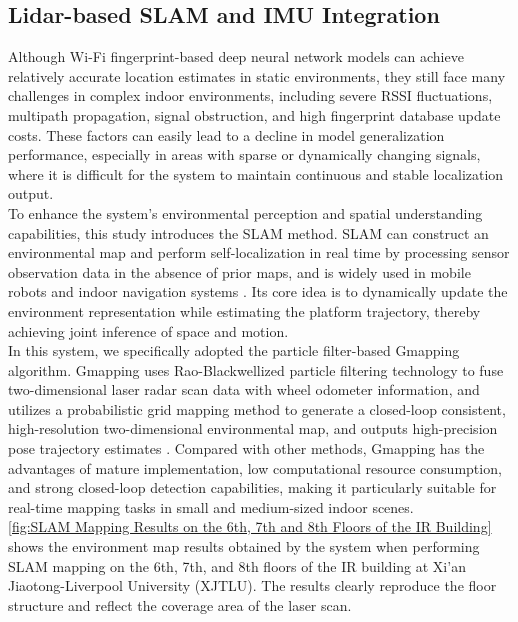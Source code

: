 \documentclass[12pt,a4paper]{article}
\numberwithin{equation}{section}
\begin{document}
\subsection{Lidar-based SLAM and IMU Integration}
Although Wi-Fi fingerprint-based deep neural network models can achieve relatively accurate location estimates in static environments, they still face many challenges in complex indoor environments, including severe RSSI fluctuations, multipath propagation, signal obstruction, and high fingerprint database update costs. These factors can easily lead to a decline in model generalization performance, especially in areas with sparse or dynamically changing signals, where it is difficult for the system to maintain continuous and stable localization output.\\
To enhance the system's environmental perception and spatial understanding capabilities, this study introduces the SLAM method. SLAM can construct an environmental map and perform self-localization in real time by processing sensor observation data in the absence of prior maps, and is widely used in mobile robots and indoor navigation systems \cite{durrant2006slam}. Its core idea is to dynamically update the environment representation while estimating the platform trajectory, thereby achieving joint inference of space and motion.\\
In this system, we specifically adopted the particle filter-based Gmapping algorithm. Gmapping uses Rao-Blackwellized particle filtering technology to fuse two-dimensional laser radar scan data with wheel odometer information, and utilizes a probabilistic grid mapping method to generate a closed-loop consistent, high-resolution two-dimensional environmental map, and outputs high-precision pose trajectory estimates \cite{grisetti2007improved}. Compared with other methods, Gmapping has the advantages of mature implementation, low computational resource consumption, and strong closed-loop detection capabilities, making it particularly suitable for real-time mapping tasks in small and medium-sized indoor scenes.\\
\autoref{fig:SLAM Mapping Results on the 6th, 7th and 8th Floors of the IR Building} shows the environment map results obtained by the system when performing SLAM mapping on the 6th, 7th, and 8th floors of the IR building at Xi'an Jiaotong-Liverpool University (XJTLU). The results clearly reproduce the floor structure and reflect the coverage area of the laser scan.
\end{document}
